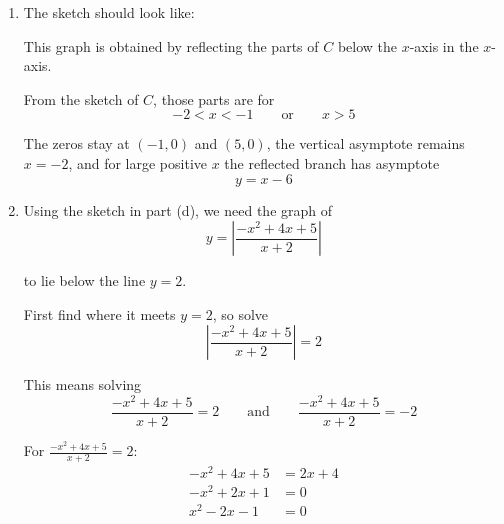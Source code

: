 \documentclass[leqno]{article}
\begin{document}
\begin{enumerate}[
  label=\textbf{\arabic*.},
  leftmargin=*,
  topsep=0pt,
  partopsep=0pt,
  parsep=0pt
]
\begin{djsSolution}
\begin{enumerate}[label=\textbf{(\alph*)}]
  The intersection with the $y$-axis is found by putting $x=0$:
  \[
  y=\frac{5}{2}
  \]

  so the $y$-intercept is
  \[
  \left(0,\frac52\right)
  \]

  Therefore the axis intersections are $(-1,0)$, $(5,0)$ and $\left(0,\frac52\right)$.

  \item The sketch should look like:\par\nopagebreak


  This graph is obtained by reflecting the parts of $C$ below the $x$-axis in the $x$-axis.

  From the sketch of $C$, those parts are for
  \[
  -2<x<-1\qquad\text{or}\qquad x>5
  \]

  The zeros stay at $(-1,0)$ and $(5,0)$, the vertical asymptote remains $x=-2$, and for large positive $x$ the reflected branch has asymptote
  \[
  y=x-6
  \]

  \item Using the sketch in part (d), we need the graph of
  \[
  y=\left|\frac{-x^2+4x+5}{x+2}\right|
  \]

  to lie below the line $y=2$.

  First find where it meets $y=2$, so solve
  \[
  \left|\frac{-x^2+4x+5}{x+2}\right|=2
  \]

  This means solving
  \[
  \frac{-x^2+4x+5}{x+2}=2
  \qquad\text{and}\qquad
  \frac{-x^2+4x+5}{x+2}=-2
  \]

  For $\frac{-x^2+4x+5}{x+2}=2$:
  \begin{align*}
  -x^2+4x+5&=2x+4\\
  -x^2+2x+1&=0\\
  x^2-2x-1&=0
  \end{align*}


\end{enumerate}
\end{djsSolution}
\end{enumerate}
\end{document}
